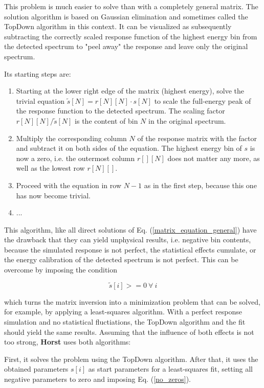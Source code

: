 \documentclass{article}
\begin{document}
This problem is much easier to solve than with a completely general matrix.
The solution algorithm is based on Gaussian elimination and sometimes called the TopDown algorithm in this context.
It can be visualized as subsequently subtracting the correctly scaled response function of the highest energy bin from the detected spectrum to "peel away" the response and leave only the original spectrum.

Its starting steps are:

\begin{enumerate}
	\item{Starting at the lower right edge of the matrix (highest energy), solve the trivial equation $\tilde{s}[N] = r[N][N] \cdot s[N]$ to scale the full-energy peak of the response function to the detected spectrum. 
		The scaling factor $r[N][N]/\tilde{s}[N]$ is the content of bin $N$ in the original spectrum.}
	\item{Multiply the corresponding column $N$ of the response matrix with the factor and subtract it on both sides of the equation. The highest energy bin of $s$ is now a zero, i.e. the outermost column $r[][N]$ does not matter any more, as well as the lowest row $r[N][]$.}
	\item{Proceed with the equation in row $N-1$ as in the first step, because this one has now become trivial.}
	\item{...}
\end{enumerate}

This algorithm, like all direct solutions of Eq. (\ref{matrix_equation_general}) have the drawback that they can yield unphysical results, i.e. negative bin contents, because the simulated response is not perfect, the statistical effects cumulate, or the energy calibration of the detected spectrum is not perfect.
This can be overcome by imposing the condition

\begin{equation}
	\label{no_zeros}
	\tilde{s}[i] >= 0 ~ \forall ~ i
\end{equation}

which turns the matrix inversion into a minimization problem that can be solved, for example, by applying a least-squares algorithm.
With a perfect response simulation and no statistical fluctiations, the TopDown algorithm and the fit should yield the same results.
Assuming that the influence of both effects is not too strong, \textbf{Horst} uses both algorithms: 

First, it solves the problem using the TopDown algorithm. After that, it uses the obtained parameters $s[i]$ as start parameters for a least-squares fit, setting all negative parameters to zero and imposing Eq. (\ref{no_zeros}).
\end{document}
